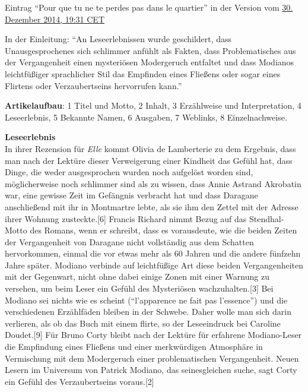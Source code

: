\documentclass[fontsize=12pt]{scrartcl}
\begin{document}
Eintrag "`Pour que tu ne te perdes pas dans le quartier"' in der Version vom \href{https://de.wikipedia.org/w/index.php?title=Pour_que_tu_ne_te_perdes_pas_dans_le_quartier\&oldid=137248287}{30. Dezember 2014, 19:31 CET}

In der Einleitung: "`An Leseerlebnissen wurde geschildert, dass Unausgesprochenes sich schlimmer anf\"uhlt als Fakten, dass Pro\-ble\-ma\-ti\-sches aus der Vergangenheit einen mysteri\"osen Modergeruch entfaltet und dass Modianos leichtf\"u{\ss}iger sprachlicher Stil das Empfinden eines Flie{\ss}ens oder sogar eines Flirtens oder Verzaubertseins hervorrufen kann."'

\textbf{Artikelaufbau}: 1 Titel und Motto, 2 Inhalt, 3 Erz\"ahlweise und Interpretation, 4\,Leseerlebnis, 5 Bekannte Namen, 6 Ausgaben, 7 Weblinks, 8 Einzelnachweise.

\textbf{Leseerlebnis}\\
In ihrer Rezension f\"ur \textit{Elle} kommt Olivia de Lamberterie zu dem Ergebnis, dass man nach der Lekt\"ure dieser Verweigerung einer Kindheit das Ge\-f\"uhl hat, dass Dinge, die weder ausgesprochen wurden noch aufgel\"ost worden sind, m\"oglicherweise noch schlimmer sind als zu wissen, dass Annie Astrand Akrobatin war, eine gewisse Zeit im Gef\"angnis verbracht hat und dass Daragane anschlie{\ss}end mit ihr in Mont\-mar\-tre lebte, als sie ihm den Zettel mit der Adresse ihrer Wohnung zusteckte.[6] Francis Richard nimmt Bezug auf das Stendhal-Motto des Romans, wenn er schreibt, dass es vorausdeute, wie die beiden Zei\-ten der Vergangenheit von Daragane nicht vollst\"andig aus dem Schat\-ten her\-vor\-kom\-men, einmal die vor et\-was mehr als 60 Jah\-ren und die andere f\"unfzehn Jahre sp\"ater. Modiano verbinde auf leichtf\"u{\ss}ige Art diese beiden Vergangenhei\-ten mit der Gegenwart, nicht ohne dabei einige Zonen mit einer Warnung zu versehen, um beim Leser ein Gef\"uhl des Mysteri\"osen wachzuhalten.[3] Bei Modiano sei nichts wie es scheint ("`l'apparence ne fait pas l'essence"') und die verschiedenen Erz\"ahlf\"aden bleiben in der Schwebe. Daher wolle man sich darin verlieren, als ob das Buch mit einem flirte, so der Leseeindruck bei Caroline Doudet.[9] F\"ur Bruno Corty bleibt nach der Lekt\"ure f\"ur erfahrene Modiano-Leser die Empfindung eines Flie{\ss}ens und einer merkw\"urdigen Atmosph\"are in Vermischung mit dem Modergeruch einer pro\-ble\-ma\-tischen Vergangenheit. Neuen Lesern im Universum von Patrick Modiano, das seinesgleichen suche, sagt Corty ein Ge\-f\"uhl des Verzaubertseins voraus.[2]
\end{document}
